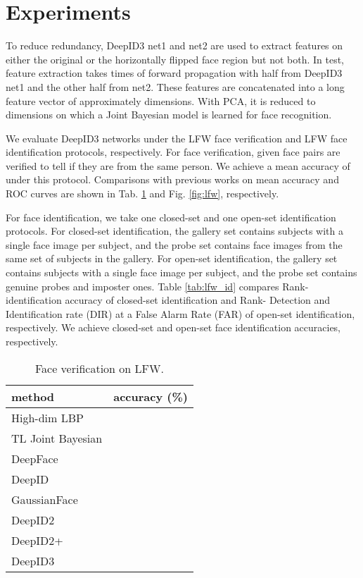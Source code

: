\documentclass[10pt,twocolumn,letterpaper]{article}
\begin{document}
\section{Experiments}

To reduce redundancy, DeepID3 net1 and net2 are used to extract features on either the original or the horizontally flipped face region but not both. In test, feature extraction takes  times of forward propagation with half from DeepID3 net1 and the other half from net2. These features are concatenated into a long feature vector of approximately  dimensions. With PCA, it is reduced to  dimensions on which a Joint Bayesian model is learned for face recognition.

We evaluate DeepID3 networks under the LFW face verification \cite{huang2007a} and LFW face identification \cite{best-rowden2014,taigman2014b} protocols, respectively. For face verification,  given face pairs are verified to tell if they are from the same person. We achieve a mean accuracy of  under this protocol. Comparisons with previous works on mean accuracy and ROC curves are shown in Tab. \ref{tab:lfw} and Fig. \ref{fig:lfw}, respectively.

For face identification, we take one closed-set and one open-set identification protocols. For closed-set identification, the gallery set contains  subjects with a single face image per subject, and the probe set contains  face images from the same set of subjects in the gallery. For open-set identification, the gallery set contains  subjects with a single face image per subject, and the probe set contains  genuine probes and  imposter ones. Table \ref{tab:lfw_id} compares Rank- identification accuracy of closed-set identification and Rank- Detection and Identification rate (DIR) at a  False Alarm Rate (FAR) of open-set identification, respectively. We achieve  closed-set and  open-set face identification accuracies, respectively.

\begin{table}[t]
\caption{Face verification on LFW.}
\label{tab:lfw}
\begin{center}
\begin{tabular}{p{100pt}|p{100pt}}
\toprule
method & accuracy (\%) \\
\midrule
High-dim LBP \cite{chen2013} &  \\
TL Joint Bayesian \cite{cao2013} &  \\
DeepFace \cite{taigman2014a} &  \\
DeepID \cite{sun2014a} &  \\
GaussianFace \cite{lu2014,lu2015} &  \\
DeepID2 \cite{sun2014b,sun2014b2} &  \\
DeepID2+ \cite{sun2014c} &  \\
DeepID3 & \bm{} \\
\bottomrule
\end{tabular}
\end{center}
\end{table}
\end{document}
